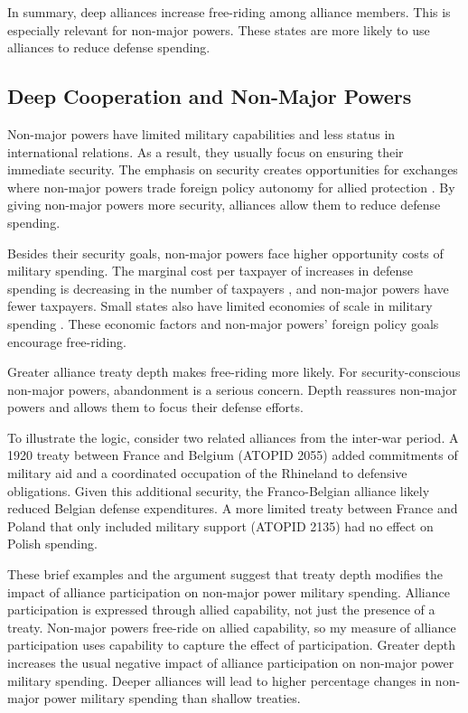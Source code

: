 \documentclass[12pt]{article}
\begin{document}
In summary, deep alliances increase free-riding among alliance members. 
This is especially relevant for non-major powers.
These states are more likely to use alliances to reduce defense spending. 


\subsection{Deep Cooperation and Non-Major Powers} 


Non-major powers have limited military capabilities and less status in international relations. 
As a result, they usually focus on ensuring their immediate security.  
The emphasis on security creates opportunities for exchanges where non-major powers trade foreign policy autonomy for allied protection \citep{Altfield1984, Morrow1991}. 
By giving non-major powers more security, alliances allow them to reduce defense spending. 


Besides their security goals, non-major powers face higher opportunity costs of military spending. 
The marginal cost per taxpayer of increases in defense spending is decreasing in the number of taxpayers \citep{DudleyMontmarquette1981}, and non-major powers have fewer taxpayers. 
Small states also have limited economies of scale in military spending \citep{Moravcsik1991, Kapstein1991, Anderton1995, Devore2013}.
These economic factors and non-major powers' foreign policy goals encourage free-riding.  


Greater alliance treaty depth makes free-riding more likely. 
For security-conscious non-major powers, abandonment is a serious concern. 
Depth reassures non-major powers and allows them to focus their defense efforts. 


To illustrate the logic, consider two related alliances from the inter-war period. 
A 1920 treaty between France and Belgium (ATOPID 2055) added commitments of military aid and a coordinated occupation of the Rhineland to defensive obligations. 
Given this additional security, the Franco-Belgian alliance likely reduced Belgian defense expenditures. 
A more limited treaty between France and Poland that only included military support (ATOPID 2135) had no effect on Polish spending.  
 
 
These brief examples and the argument suggest that treaty depth modifies the impact of alliance participation on non-major power military spending. 
Alliance participation is expressed through allied capability, not just the presence of a treaty. 
Non-major powers free-ride on allied capability, so my measure of alliance participation uses capability to capture the effect of participation. 
Greater depth increases the usual negative impact of alliance participation on non-major power military spending. 
Deeper alliances will lead to higher percentage changes in non-major power military spending than shallow treaties. 
 
\end{document}
